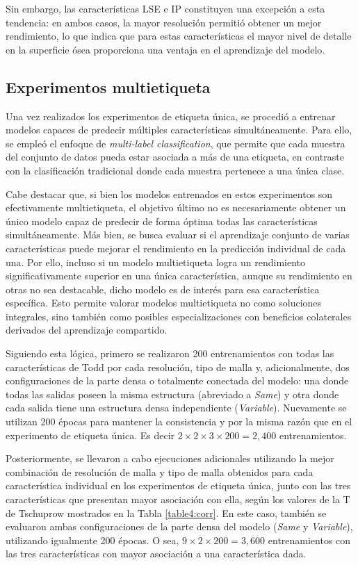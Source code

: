 Sin embargo, las características LSE e IP constituyen una excepción a esta tendencia: en ambos casos, la mayor resolución permitió obtener un mejor rendimiento, lo que indica que para estas características el mayor nivel de detalle en la superficie ósea proporciona una ventaja en el aprendizaje del modelo.

\subsection{Experimentos multietiqueta}
\label{multi_tag_exps}
Una vez realizados los experimentos de etiqueta única, se procedió a entrenar modelos capaces de predecir múltiples características simultáneamente. Para ello, se empleó el enfoque de \textit{multi-label classification}, que permite que cada muestra del conjunto de datos pueda estar asociada a más de una etiqueta, en contraste con la clasificación tradicional donde cada muestra pertenece a una única clase. 

Cabe destacar que, si bien los modelos entrenados en estos experimentos son efectivamente multietiqueta, el objetivo último no es necesariamente obtener un único modelo capaz de predecir de forma óptima todas las características simultáneamente. Más bien, se busca evaluar si el aprendizaje conjunto de varias características puede mejorar el rendimiento en la predicción individual de cada una. Por ello, incluso si un modelo multietiqueta logra un rendimiento significativamente superior en una única característica, aunque su rendimiento en otras no sea destacable, dicho modelo es de interés para esa característica específica. Esto permite valorar modelos multietiqueta no como soluciones integrales, sino también como posibles especializaciones con beneficios colaterales derivados del aprendizaje compartido.

Siguiendo esta lógica, primero se realizaron 200 entrenamientos con todas las características de Todd por cada resolución, tipo de malla y, adicionalmente, dos configuraciones de la parte densa o totalmente conectada del modelo: una donde todas las salidas poseen la misma estructura (abreviado a \textit{Same}) y otra donde cada salida tiene una estructura densa independiente (\textit{Variable}). Nuevamente se utilizan 200 épocas para mantener la consistencia y por la misma razón que en el experimento de etiqueta única. Es decir $2 \times 2 \times 3 \times 200 = 2,400$ entrenamientos.

Posteriormente, se llevaron a cabo ejecuciones adicionales utilizando la mejor combinación de resolución de malla y tipo de malla obtenidos para cada característica individual en los experimentos de etiqueta única, junto con las tres características que presentan mayor asociación con ella, según los valores de la T de Tschuprow mostrados en la Tabla \ref{table4:corr}. En este caso, también se evaluaron ambas configuraciones de la parte densa del modelo (\textit{Same} y \textit{Variable}), utilizando igualmente 200 épocas. O sea, $9 \times 2 \times 200 = 3,600$ entrenamientos con las tres características con mayor asociación a una característica dada.

